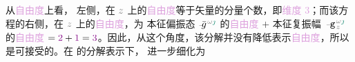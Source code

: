 从\textcolor{Plum}{自由度}上看， 左侧，在 $\mathcolor{gray}{z}$ 上的\textcolor{Plum}{自由度}等于矢量的分量个数，即\textcolor{Plum}{维度 3}；而该方程的右侧，在 $\mathcolor{gray}{z}$ 上的\textcolor{Plum}{自由度}，为 \textcolor{PineGreen}{本征偏振态} $\xint{{}^{}_{\mathcolor{gray}{-}}}{10}{\bar{g}}^{\;\!\mathcolor{gray}{\omega} \textcolor{PineGreen}{\jmath}}$ 的\textcolor{Plum}{自由度} $+$ \textcolor{PineGreen}{本征复振幅} $\xint{\begin{smallmatrix} ~ \\ {}^{}_{\mathcolor{gray}{-}} \\ ~ \end{smallmatrix}}{09}{\mathtt{g}}^{\;\!\mathcolor{gray}{\omega} \textcolor{PineGreen}{\jmath}}_{\;\! \mathcolor{gray}{z}}$ 的\textcolor{Plum}{自由度} $= \textcolor{Plum}{2} + \textcolor{Plum}{1} = \textcolor{Plum}{3}$。因此，从这个角度，该分解并没有降低表示\textcolor{Plum}{自由度}，所以是可接受的。在  的分解表示下， 进一步细化为
